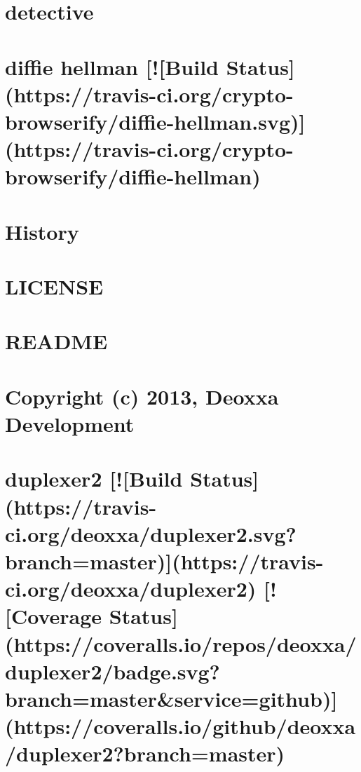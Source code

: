 \documentclass[twoside]{book}
\newcommand{\+}{\discretionary{\mbox{\scriptsize$\hookleftarrow$}}{}{}}
\begin{document}
\chapter{detective}
\label{md_dsmacc_examples_DRmerge_node_modules_detective_readme}

\chapter{diffie hellman \mbox{[}!\mbox{[}Build Status\mbox{]}(https\+://travis-\/ci.org/crypto-\/browserify/diffie-\/hellman.svg)\mbox{]}(https\+://travis-\/ci.org/crypto-\/browserify/diffie-\/hellman)}
\label{md_dsmacc_examples_DRmerge_node_modules_diffie-hellman_readme}

\chapter{History}
\label{md_dsmacc_examples_DRmerge_node_modules_domain-browser_HISTORY}

\chapter{L\+I\+C\+E\+N\+SE}
\label{md_dsmacc_examples_DRmerge_node_modules_domain-browser_LICENSE}

\chapter{R\+E\+A\+D\+ME}
\label{md_dsmacc_examples_DRmerge_node_modules_domain-browser_README}

\chapter{Copyright (c) 2013, Deoxxa Development}
\label{md_dsmacc_examples_DRmerge_node_modules_duplexer2_LICENSE}

\chapter{duplexer2 \mbox{[}!\mbox{[}Build Status\mbox{]}(https\+://travis-\/ci.org/deoxxa/duplexer2.svg?branch=master)\mbox{]}(https\+://travis-\/ci.org/deoxxa/duplexer2) \mbox{[}!\mbox{[}Coverage Status\mbox{]}(https\+://coveralls.io/repos/deoxxa/duplexer2/badge.svg?branch=master\&service=github)\mbox{]}(https\+://coveralls.io/github/deoxxa/duplexer2?branch=master)}
\label{md_dsmacc_examples_DRmerge_node_modules_duplexer2_README}

\end{document}

